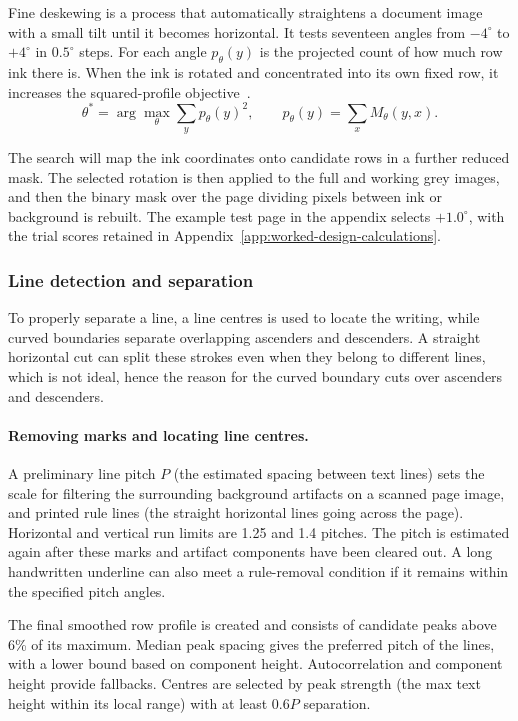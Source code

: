 Fine deskewing is a process that automatically straightens a document image with a small tilt until it becomes horizontal. It tests seventeen angles from $-4^\circ$ to $+4^\circ$ in $0.5^\circ$ steps. For each angle $p_\theta(y)$ is the projected count of how much row ink there is. When the ink is rotated and concentrated into its own fixed row, it increases the squared-profile objective~\cite{postl1986}.
\begin{equation}
\theta^*=\arg\max_\theta\sum_y p_\theta(y)^2,\qquad
p_\theta(y)=\sum_x M_\theta(y,x).
\label{eq:des-skew}
\end{equation}

The search will map the ink coordinates onto candidate rows in a further reduced mask. The selected rotation is then applied to the full and working grey images, and then the binary mask over the page dividing pixels between ink or background is rebuilt. The example test page in the appendix selects $+1.0^\circ$, with the trial scores retained in Appendix~\ref{app:worked-design-calculations}.

\subsubsection{Line detection and separation}
To properly separate a line, a line centres is used to locate the writing, while curved boundaries separate overlapping ascenders and descenders. A straight horizontal cut can split these strokes even when they belong to different lines, which is not ideal, hence the reason for the curved boundary cuts over ascenders and descenders.

\paragraph{Removing marks and locating line centres.}
A preliminary line pitch $P$ (the estimated spacing between text lines) sets the scale for filtering the surrounding background artifacts on a scanned page image, and printed rule lines (the straight horizontal lines going across the page). Horizontal and vertical run limits are 1.25 and 1.4 pitches. The pitch is estimated again after these marks and artifact components have been cleared out. A long handwritten underline can also meet a rule-removal condition if it remains within the specified pitch angles.

The final smoothed row profile is created and consists of candidate peaks above 6\% of its maximum. Median peak spacing gives the preferred pitch of the lines, with a lower bound based on component height. Autocorrelation and component height provide fallbacks. Centres are selected by peak strength (the max text height within its local range) with at least $0.6P$ separation.

